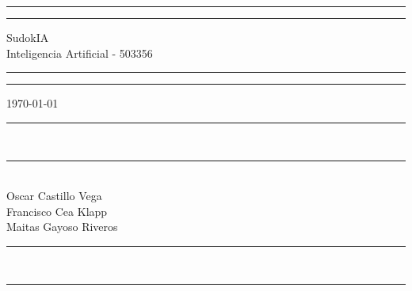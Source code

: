 \vspace*{5cm}
\hrule
\vspace*{0.03cm}
\hrule
\begin{center}
  \begin{minipage}{0.7\textwidth}
    \begin{center}
      \Large{SudokIA}\\
      \small{Inteligencia Artificial - 503356}
    \end{center}
  \end{minipage}
\end{center}
\hrule
\vspace*{0.03cm}
\hrule
\begin{center}\today\end{center}
\vspace*{6cm}
\begin{center}
  \noindent\rule{5cm}{0.4pt}\\
  \vspace*{-0.45cm}
  \noindent\rule{5cm}{0.4pt}\\
  Oscar Castillo Vega\\
  Francisco Cea Klapp \\
  Maitas Gayoso Riveros \\
  \vspace*{-.05cm}
  \noindent\rule{5cm}{0.4pt}\\
  \vspace*{-0.45cm}
  \noindent\rule{5cm}{0.4pt}\\

\end{center}

